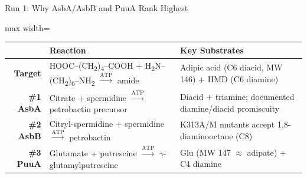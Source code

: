 \documentclass[aspectratio=169, 11pt]{beamer}
\begin{document}
\begin{frame}{Run 1: Why AsbA/AsbB and PuuA Rank Highest}
\vspace{-6pt}

{\scriptsize
\begin{adjustbox}{max width=\textwidth}
\begin{tabular}{@{}r p{7.0cm} p{4.5cm}@{}}
\toprule
 & \textbf{Reaction} & \textbf{Key Substrates} \\
\midrule
\rowcolor{accentred!8}
\textbf{Target} & HOOC--(CH\textsubscript{2})\textsubscript{4}--COOH + H\textsubscript{2}N--(CH\textsubscript{2})\textsubscript{6}--NH\textsubscript{2} $\xrightarrow{\text{ATP}}$ amide & Adipic acid (C6 diacid, MW 146) + HMD (C6 diamine) \\[4pt]
\rowcolor{accentblue!8}
\textbf{\#1 AsbA} & Citrate + spermidine $\xrightarrow{\text{ATP}}$ petrobactin precursor & Diacid + triamine; documented diamine/diacid promiscuity \\[4pt]
\rowcolor{accentblue!8}
\textbf{\#2 AsbB} & Citryl-spermidine + spermidine $\xrightarrow{\text{ATP}}$ petrobactin & K313A/M mutants accept 1,8-diaminooctane (C8) \\[4pt]
\rowcolor{accentgreen!8}
\textbf{\#3 PuuA} & Glutamate + putrescine $\xrightarrow{\text{ATP}}$ $\gamma$-glutamylputrescine & Glu (MW 147 $\approx$ adipate) + C4 diamine \\
\bottomrule
\end{tabular}
\end{adjustbox}
}


\end{frame}
\end{document}

